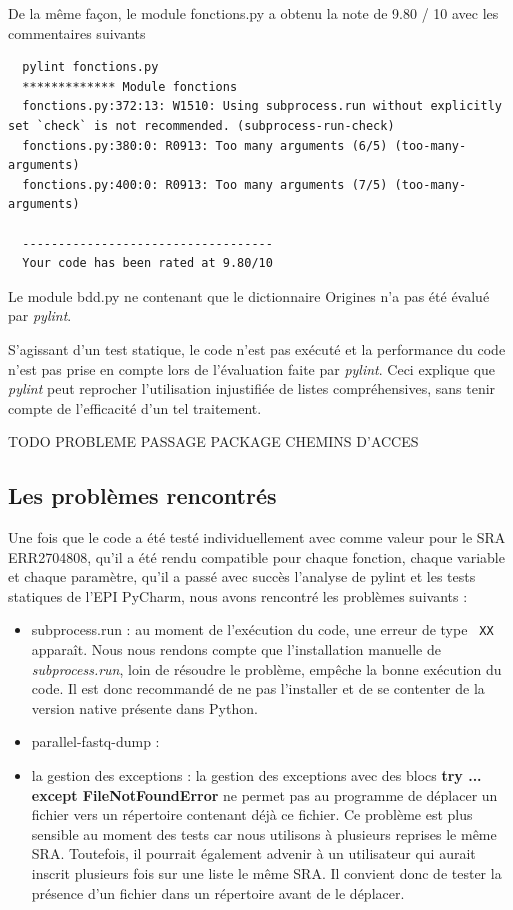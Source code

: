 \documentclass[twoside,a4paper,11pt,frenchb,openany]{report}
\begin{document}
De la même façon, le module fonctions.py a obtenu la note de 9.80 / 10 avec les commentaires suivants

\begin{verbatim}  pylint fonctions.py
  ************* Module fonctions
  fonctions.py:372:13: W1510: Using subprocess.run without explicitly set `check` is not recommended. (subprocess-run-check)
  fonctions.py:380:0: R0913: Too many arguments (6/5) (too-many-arguments)
  fonctions.py:400:0: R0913: Too many arguments (7/5) (too-many-arguments)

  -----------------------------------
  Your code has been rated at 9.80/10\end{verbatim}

Le module bdd.py ne contenant que le dictionnaire Origines n'a pas été évalué par \textit{pylint}.

S'agissant d'un test statique, le code n'est pas exécuté et la performance du code n'est pas prise en compte lors de l'évaluation faite par \textit{pylint}. Ceci explique que \textit{pylint} peut reprocher l'utilisation injustifiée de listes compréhensives, sans tenir compte de l'efficacité d'un tel traitement.

TODO PROBLEME PASSAGE PACKAGE
CHEMINS D'ACCES

\subsection{Les problèmes rencontrés}

Une fois que le code a été testé individuellement avec comme valeur pour le SRA ERR2704808, qu'il a été rendu compatible pour chaque fonction, chaque variable et chaque paramètre, qu'il a passé avec succès l'analyse de pylint et les tests statiques de l'EPI PyCharm, nous avons rencontré les problèmes suivants :  
\begin{itemize}
\item subprocess.run : au moment de l'exécution du code, une erreur de type \texttt{  XX} apparaît. Nous nous rendons compte que l'installation manuelle de \textit{subprocess.run}, loin de résoudre le problème, empêche la bonne exécution du code. Il est donc recommandé de ne pas l'installer et de se contenter de la version native présente dans Python.
\item parallel-fastq-dump :
\item la gestion des exceptions : la gestion des exceptions avec des blocs \textbf{try ... except FileNotFoundError} ne permet pas au programme de déplacer un fichier vers un répertoire contenant déjà ce fichier. Ce problème est plus sensible au moment des tests car nous utilisons à plusieurs reprises le même SRA. Toutefois, il pourrait également advenir à un utilisateur qui aurait inscrit plusieurs fois sur une liste le même SRA. Il convient donc de tester la présence d'un fichier dans un répertoire avant de le déplacer.
\end{itemize}
\end{document}
